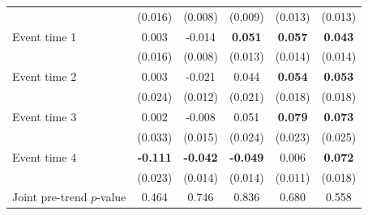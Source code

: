 \begin{table}[htbp]
{{\begin{tabular}{lccccc}
       & (0.016) & (0.008) & (0.009) & (0.013) & (0.013)\\
      Event time 1 & 0.003 & -0.014 & \textbf{0.051} & \textbf{0.057} & \textbf{0.043}\\
       & (0.016) & (0.008) & (0.013) & (0.014) & (0.014)\\
      Event time 2 & 0.003 & -0.021 & 0.044 & \textbf{0.054} & \textbf{0.053}\\
       & (0.024) & (0.012) & (0.021) & (0.018) & (0.018)\\
      Event time 3 & 0.002 & -0.008 & 0.051 & \textbf{0.079} & \textbf{0.073}\\
       & (0.033) & (0.015) & (0.024) & (0.023) & (0.025)\\
      Event time 4 & \textbf{-0.111} & \textbf{-0.042} & \textbf{-0.049} & 0.006 & \textbf{0.072}\\
       & (0.023) & (0.014) & (0.014) & (0.011) & (0.018)\\
      \midrule
      Joint pre-trend $p$-value & 0.464 & 0.746 & 0.836 & 0.680 & 0.558\\
      \bottomrule
   \end{tabular}
   }}

\end{table}
